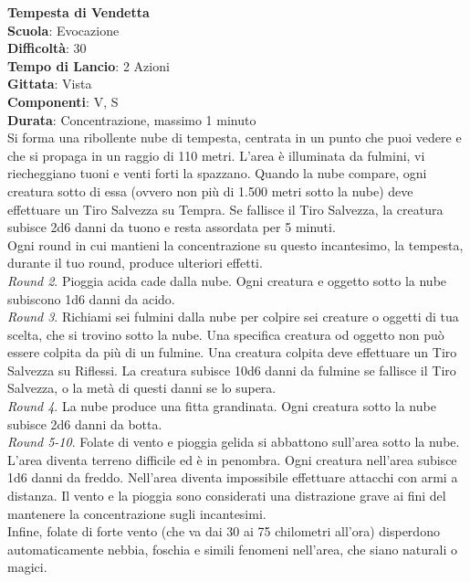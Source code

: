 \begin{multicols}{2}
\medskip\textbf{Tempesta di Vendetta}\\
\textbf{Scuola}: Evocazione\\
\textbf{Difficoltà}: 30\\
\textbf{Tempo di Lancio}: 2 Azioni\\
\textbf{Gittata}: Vista\\
\textbf{Componenti}: V, S\\
\textbf{Durata}: Concentrazione, massimo 1 minuto\\
Si forma una ribollente nube di tempesta, centrata in un punto che puoi vedere e che si propaga in un raggio di 110 metri. L'area è illuminata da fulmini, vi riecheggiano tuoni e venti forti la spazzano. Quando la nube compare, ogni creatura sotto di essa (ovvero non più di 1.500 metri sotto la nube) deve effettuare un Tiro Salvezza su Tempra. Se fallisce il Tiro Salvezza, la creatura subisce 2d6 danni da tuono e resta assordata per 5 minuti.\\
Ogni round in cui mantieni la concentrazione su questo incantesimo, la tempesta, durante il tuo round, produce ulteriori effetti.\\
\textit{Round 2}. Pioggia acida cade dalla nube. Ogni creatura e oggetto sotto la nube subiscono 1d6 danni da acido.\\
\textit{Round 3}. Richiami sei fulmini dalla nube per colpire sei creature o oggetti di tua scelta, che si trovino sotto la nube. Una specifica creatura od oggetto non può essere colpita da più di un fulmine. Una creatura colpita deve effettuare un Tiro Salvezza su Riflessi. La creatura subisce 10d6 danni da fulmine se fallisce il Tiro Salvezza, o la metà di questi danni se lo supera. \\
\textit{Round 4}. La nube produce una fitta grandinata. Ogni creatura sotto la nube subisce 2d6 danni da botta.\\
\textit{Round 5-10}. Folate di vento e pioggia gelida si abbattono sull'area sotto la nube. L'area diventa terreno difficile ed è in penombra. Ogni creatura nell'area subisce 1d6 danni da freddo. Nell'area diventa impossibile effettuare attacchi con armi a distanza. Il vento e la pioggia sono considerati una distrazione grave ai fini del mantenere la concentrazione sugli incantesimi.\\ Infine, folate di forte vento (che va dai 30 ai 75 chilometri all'ora) disperdono automaticamente nebbia, foschia e simili fenomeni nell'area, che siano naturali o magici.



\end{multicols}

